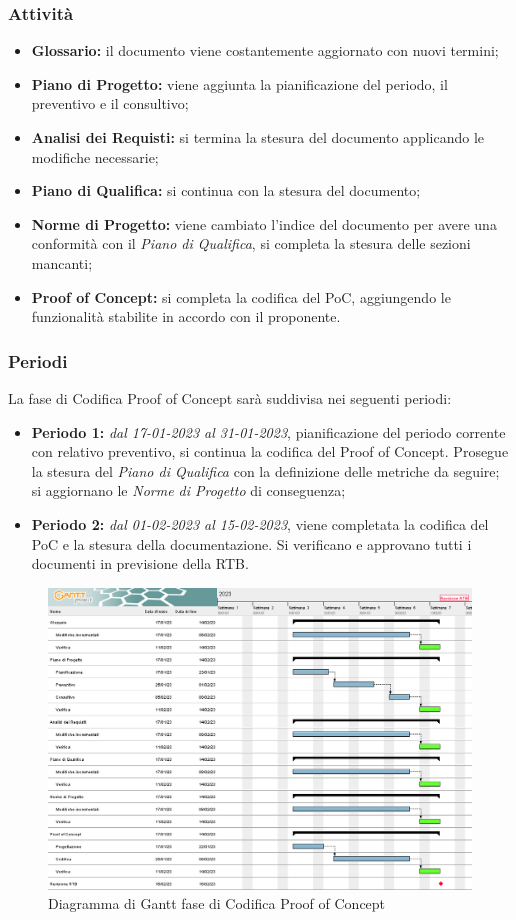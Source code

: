 \subsubsection{Attività}
\begin{itemize}
\item \textbf{Glossario:} il documento viene costantemente aggiornato con nuovi termini;
\item \textbf{Piano di Progetto:} viene aggiunta la pianificazione del periodo, il preventivo e il consultivo;  
\item \textbf{Analisi dei Requisti:} si termina la stesura del documento applicando le modifiche necessarie;
\item \textbf{Piano di Qualifica:} si continua con la stesura del documento;
\item \textbf{Norme di Progetto:} viene cambiato l'indice del documento per avere una conformità con il \textit{Piano di Qualifica}, 
si completa la stesura delle sezioni mancanti;
\item \textbf{Proof of Concept:} si completa la codifica del PoC, aggiungendo le funzionalità stabilite in accordo con il proponente.
\end{itemize}

\subsubsection{Periodi}
La fase di Codifica Proof of Concept sarà suddivisa nei seguenti periodi:
\begin{itemize}
\item \textbf{Periodo 1:} \textit{dal 17-01-2023 al 31-01-2023}, pianificazione del periodo corrente con relativo preventivo, si continua la codifica 
del Proof of Concept. Prosegue la stesura del \textit{Piano di Qualifica} con la definizione delle metriche da seguire; si aggiornano le \textit{Norme di Progetto} di conseguenza;
\item \textbf{Periodo 2:} \textit{dal 01-02-2023 al 15-02-2023},  viene completata la codifica del PoC e la stesura della documentazione. Si verificano e approvano tutti i documenti in 
previsione della RTB.
\end{itemize}

\begin{figure}[H]
    \centering
    \includegraphics[scale=0.56]{image/gantt_terzo_periodo.png}
    \caption{Diagramma di Gantt fase di Codifica Proof of Concept}
\end{figure}
\pagebreak